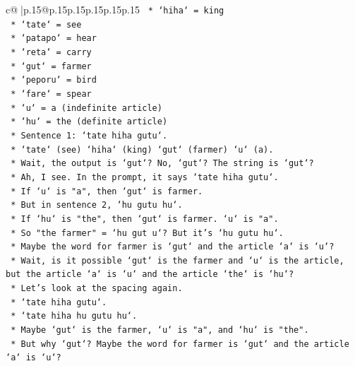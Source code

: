 \documentclass{article}
\begin{document}
{\begin{supertabular}{c@{$\;$}|p{.15\linewidth}@{}p{.15\linewidth}p{.15\linewidth}p{.15\linewidth}p{.15\linewidth}p{.15\linewidth}}
{{{\texttt{                *   `hiha` = king} \\
\texttt{                *   `tate` = see} \\
\texttt{                *   `patapo` = hear} \\
\texttt{                *   `reta` = carry} \\
\texttt{                *   `gut` = farmer} \\
\texttt{                *   `peporu` = bird} \\
\texttt{                *   `fare` = spear} \\
\texttt{                *   `u` = a (indefinite article)} \\
\texttt{                *   `hu` = the (definite article)} \\
\texttt{            *   Sentence 1: `tate hiha gutu`.} \\
\texttt{                *   `tate` (see) `hiha` (king) `gut` (farmer) `u` (a).} \\
\texttt{                *   Wait, the output is `gut`? No, `gut`? The string is `gut`?} \\
\texttt{                *   Ah, I see. In the prompt, it says `tate hiha gutu`.} \\
\texttt{                *   If `u` is "a", then `gut` is farmer.} \\
\texttt{                *   But in sentence 2, `hu gutu hu`.} \\
\texttt{                *   If `hu` is "the", then `gut` is farmer. `u` is "a".} \\
\texttt{                *   So "the farmer" = `hu gut u`? But it's `hu gutu hu`.} \\
\texttt{                *   Maybe the word for farmer is `gut` and the article `a` is `u`?} \\
\texttt{                *   Wait, is it possible `gut` is the farmer and `u` is the article, but the article `a` is `u` and the article `the` is `hu`?} \\
\texttt{                *   Let's look at the spacing again.} \\
\texttt{                *   `tate hiha gutu`.} \\
\texttt{                *   `tate hiha hu gutu hu`.} \\
\texttt{                *   Maybe `gut` is the farmer, `u` is "a", and `hu` is "the".} \\
\texttt{                *   But why `gut`? Maybe the word for farmer is `gut` and the article `a` is `u`?} \\
}}}
\end{supertabular}}
\end{document}
